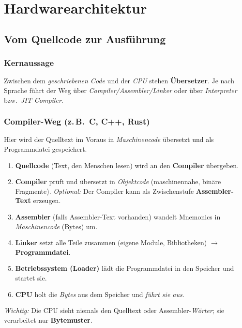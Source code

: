 \documentclass[../skript/main.tex]{subfiles}
\begin{document}
\label{chap:hardwarearchitektur}
\chapter{Hardwarearchitektur}

\section{Vom Quellcode zur Ausführung}\label{sec:toolchain}

\subsection*{Kernaussage}
Zwischen dem \emph{geschriebenen Code} und der \emph{CPU} stehen \textbf{Übersetzer}.
Je nach Sprache führt der Weg über \emph{Compiler/Assembler/Linker} oder über
\emph{Interpreter} bzw.\ \emph{JIT-Compiler}.

\subsection{Compiler-Weg (z.\,B.\ C, C++, Rust)}
Hier wird der Quelltext im Voraus in \emph{Maschinencode} übersetzt und als Programmdatei gespeichert.
\begin{enumerate}
	\item \textbf{Quellcode} (Text, den Menschen lesen) wird an den \textbf{Compiler} übergeben.
	\item \textbf{Compiler} prüft und übersetzt in \emph{Objektcode} (maschinennahe, binäre Fragmente).
	\quad\emph{Optional:} Der Compiler kann als Zwischenstufe \textbf{Assembler-Text} erzeugen.
	\item \textbf{Assembler} (falls Assembler-Text vorhanden) wandelt Mnemonics in \emph{Maschinencode} (Bytes) um.
	\item \textbf{Linker} setzt alle Teile zusammen (eigene Module, Bibliotheken) \(\rightarrow\) \textbf{Programmdatei}.
	\item \textbf{Betriebssystem (Loader)} lädt die Programmdatei in den Speicher und startet sie.
	\item \textbf{CPU} holt die \emph{Bytes} aus dem Speicher und \emph{führt sie aus}.
\end{enumerate}
\emph{Wichtig:} Die CPU sieht niemals den Quelltext oder Assembler-\emph{Wörter}; sie verarbeitet nur \textbf{Byte\-muster}.
\end{document}
